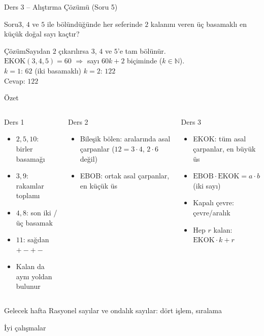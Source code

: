 \documentclass[aspectratio=169,11pt]{beamer}
\newcommand{\soru}[3]{%
\begin{frame}{#1}
  \begin{block}{Soru}\large #2\end{block}
  \pause
  \begin{exampleblock}{Çözüm}\large #3\end{exampleblock}
\end{frame}}
\begin{document}
\soru{Ders 3 -- Alıştırma Çözümü (Soru 5)}
{\(3\), \(4\) ve \(5\) ile bölündüğünde her seferinde \(2\) kalanını veren üç basamaklı en küçük doğal sayı kaçtır?}
{Sayıdan \(2\) çıkarılırsa \(3\), \(4\) ve \(5\)'e tam bölünür.\\[3pt]
\(\text{EKOK}(3,4,5)=60\) \(\Rightarrow\) sayı \(60k+2\) biçiminde (\(k\in\mathbb{N}\)).\\[3pt]
\(k=1\): \(62\) (iki basamaklı) \quad \(k=2\): \(122\)\\[3pt]
Cevap: \(122\)}

\begin{frame}{Özet}
\begin{columns}[t]
\begin{block}{Ders 1}
\small
\begin{itemize}
\item \(2,5,10\): birler basamağı
\item \(3,9\): rakamlar toplamı
\item \(4,8\): son iki / üç basamak
\item \(11\): sağdan \(+-+-\)
\item Kalan da aynı yoldan bulunur
\end{itemize}
\end{block}
\begin{block}{Ders 2}
\small
\begin{itemize}
\item Bileşik bölen: aralarında asal çarpanlar (\(12=3\cdot 4\), \(2\cdot 6\) değil)
\item EBOB: ortak asal çarpanlar, en küçük üs
\end{itemize}
\end{block}
\begin{block}{Ders 3}
\small
\begin{itemize}
\item EKOK: tüm asal çarpanlar, en büyük üs
\item \(\text{EBOB}\cdot\text{EKOK}=a\cdot b\) (iki sayı)
\item Kapalı çevre: çevre/aralık
\item Hep \(r\) kalan: \(\text{EKOK}\cdot k+r\)
\end{itemize}
\end{block}
\end{columns}
\vspace{6pt}
\begin{alertblock}{Gelecek hafta}
Rasyonel sayılar ve ondalık sayılar: dört işlem, sıralama
\end{alertblock}
\end{frame}

\begin{frame}
\centering\Large İyi çalışmalar
\end{frame}
\end{document}
